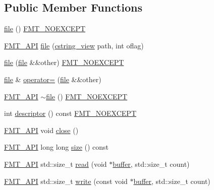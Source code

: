 \subsection*{Public Member Functions}
\begin{DoxyCompactItemize}
\item 
\hyperlink{classfile_a9219ca0c070b6bf05d6c26bd4dcb3628}{file} () \hyperlink{core_8h_aef128913e8400683b1cbd1a3a2e11df3}{F\+M\+T\+\_\+\+N\+O\+E\+X\+C\+E\+PT}
\item 
\hyperlink{core_8h_a9a4960b70582ed2620911a0b75dce0b5}{F\+M\+T\+\_\+\+A\+PI} \hyperlink{classfile_a26bc3b2f162d44e6689757e35396c61c}{file} (\hyperlink{posix_8h_ae8eb4eb4ba15f0c8755e1d5c8e7c07d9}{cstring\+\_\+view} path, int oflag)
\item 
\hyperlink{classfile_a12ab9fbce2297a5839c1d0b3159be261}{file} (\hyperlink{classfile}{file} \&\&other) \hyperlink{core_8h_aef128913e8400683b1cbd1a3a2e11df3}{F\+M\+T\+\_\+\+N\+O\+E\+X\+C\+E\+PT}
\item 
\hyperlink{classfile}{file} \& \hyperlink{classfile_a2e4cddc680ac231d6386bcef58f4ce03}{operator=} (\hyperlink{classfile}{file} \&\&other)
\item 
\hyperlink{core_8h_a9a4960b70582ed2620911a0b75dce0b5}{F\+M\+T\+\_\+\+A\+PI} \hyperlink{classfile_ab18abda35e187845274e67782840b683}{$\sim$file} () \hyperlink{core_8h_aef128913e8400683b1cbd1a3a2e11df3}{F\+M\+T\+\_\+\+N\+O\+E\+X\+C\+E\+PT}
\item 
int \hyperlink{classfile_a14a03f1516c926cc0785728ebad4175c}{descriptor} () const \hyperlink{core_8h_aef128913e8400683b1cbd1a3a2e11df3}{F\+M\+T\+\_\+\+N\+O\+E\+X\+C\+E\+PT}
\item 
\hyperlink{core_8h_a9a4960b70582ed2620911a0b75dce0b5}{F\+M\+T\+\_\+\+A\+PI} void \hyperlink{classfile_a843b122e594108e44d7435d57dbecce5}{close} ()
\item 
\hyperlink{core_8h_a9a4960b70582ed2620911a0b75dce0b5}{F\+M\+T\+\_\+\+A\+PI} long long \hyperlink{classfile_a6ddfe0a8c58656f1dcdfd90869307bf1}{size} () const
\item 
\hyperlink{core_8h_a9a4960b70582ed2620911a0b75dce0b5}{F\+M\+T\+\_\+\+A\+PI} std\+::size\+\_\+t \hyperlink{classfile_a0bd904f0a22919c36cefef0098c869e5}{read} (void $\ast$\hyperlink{printf_8h_ae986769e0053f875cd11c9fa4d22c8a8}{buffer}, std\+::size\+\_\+t count)
\item 
\hyperlink{core_8h_a9a4960b70582ed2620911a0b75dce0b5}{F\+M\+T\+\_\+\+A\+PI} std\+::size\+\_\+t \hyperlink{classfile_a3b9de9cd17abc79f4cd8b7fd48fcd9ec}{write} (const void $\ast$\hyperlink{printf_8h_ae986769e0053f875cd11c9fa4d22c8a8}{buffer}, std\+::size\+\_\+t count)

\end{DoxyCompactItemize}
